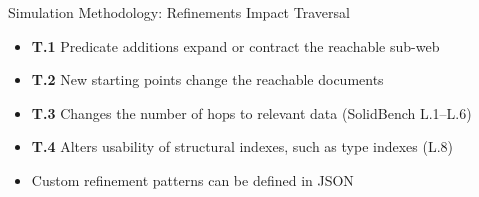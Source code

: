\begin{frame}{Simulation Methodology: Refinements Impact Traversal}
    \begin{itemize}\setlength\itemsep{1em}
        \item \textbf{T.1} Predicate additions expand or contract the reachable sub-web
        \item \textbf{T.2} New starting points change the reachable documents
        \item \textbf{T.3} Changes the number of hops to relevant data (SolidBench L.1--L.6)
        \item \textbf{T.4} Alters usability of structural indexes, such as type indexes (L.8)
        \item[$\Rightarrow$] Custom refinement patterns can be defined in JSON
    \end{itemize}
\end{frame}
